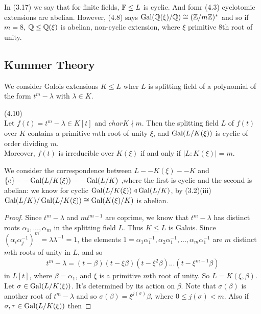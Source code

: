 \documentclass[a4paper]{article}
\begin{document}
\begin{eg}
In (3.17) we say that for finite fields, $\mathbb{F} \leq L$ is cyclic. And fomr (4.3) cyclotomic extensions are abelian. However, (4.8) says $\operatorname{Gal}(\mathbb{Q}(\xi)/\mathbb{Q}) \cong (\mathbb{Z}/m\mathbb{Z})^*$ and so if $m=8$, $\mathbb{Q} \leq \mathbb{Q}(\xi)$ is abelian, non-cyclic extension, where $\xi$ primitive $8$th root of unity.
\end{eg}

\subsection{Kummer Theory}
We consider Galois extensions $K \leq L$ wher $L$ is splitting field of a polynomial of the form $t^m-\lambda$ with $\lambda \in K$.

\begin{thm} (4.10)\\
Let $f(t) = t^m-\lambda \in K[t]$ and $char K \nmid m$. Then the splitting field $L$ of $f(t)$ over $K$ contains a primitive $m$th root of unity $\xi$, and $\operatorname{Gal}(L/K(\xi))$ is cyclic of order dividing $m$.\\
Moreover, $f(t)$ is irreducible over $K(\xi)$ if and only if $|L:K(\xi)| = m$.
\begin{rem}
We consider the correspondence between $L -- K(\xi) -- K$ and $\{e\} -- \operatorname{Gal}(L/K(\xi)) -- \operatorname{Gal}(L/K)$ ,where the first is cyclic and the second is abelian: we know for cyclic $\operatorname{Gal}(L/K(\xi)) \triangleleft \operatorname{Gal}(L/K)$, by (3.2)(iii) $\operatorname{Gal}(L/K)/\operatorname{Gal}(L/K(\xi)) \cong \operatorname{Gal}(K(\xi) / K)$ is abelian.
\begin{proof}
Since $t^m-\lambda$ and $mt^{m-1}$ are coprime, we know that $t^m-\lambda$ has distinct roots $\alpha_1,...,\alpha_m$ in the splitting field $L$. Thus $K \leq L$ is Galois. Since $(\alpha_i\alpha_j^{-1})^m = \lambda \lambda^{-1} = 1$, the elements $1 = \alpha_1\alpha_1^{-1},\alpha_2\alpha_1^{-1},...,\alpha_m\alpha_1^{-1}$ are $m$ distinct $m$th roots of unity in $L$, and so 
\begin{equation*}
\begin{aligned}
t^m-\lambda = (t-\beta)(t-\xi\beta)(t-\xi^2\beta)...(t-\xi^{m-1}\beta)
\end{aligned}
\end{equation*}
in $L[t]$, where $\beta = \alpha_1$, and $\xi$ is a primitive $m$th root of unity. So $L = K(\xi,\beta)$. Let $\sigma \in \operatorname{Gal}(L/K(\xi))$. It's determined by its action on $\beta$. Note that $\sigma(\beta)$ is another root of $t^m-\lambda$ and so $\sigma(\beta) = \xi^{j(\sigma)}\beta$, where $0 \leq j(\sigma) < m$. Also if $\sigma,\tau \in \operatorname{Gal}(L/K(\xi))$ then 

\end{proof}
\end{rem}
\end{thm}
\end{document}
